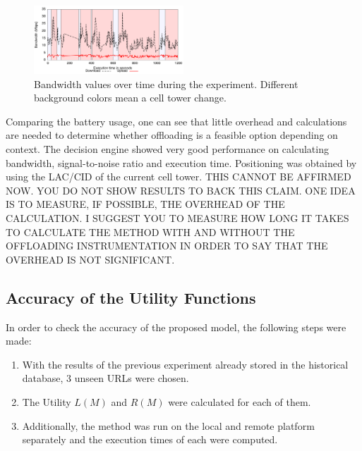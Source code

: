 \documentclass[10pt, conference, letterpaper]{IEEEtran}
\begin{document}
\begin{figure}[b]
  \centering
  \includegraphics[width=0.5\textwidth]{results/plots/bw-fluctuation/executions.png}
  \caption{Bandwidth values over time during the experiment. Different background colors mean a cell tower change.}
  \label{fig:bwtower}
\end{figure}

  
{\color{red}  Comparing the battery usage, one can see that little overhead and calculations are needed to determine whether offloading is a feasible option depending on context. The decision engine showed very good performance on calculating bandwidth, signal-to-noise ratio and execution time. Positioning was obtained by using the LAC/CID of the current cell tower. THIS CANNOT BE AFFIRMED NOW. YOU DO NOT SHOW RESULTS TO BACK THIS CLAIM. ONE IDEA IS TO MEASURE, IF POSSIBLE, THE OVERHEAD OF THE CALCULATION. I SUGGEST YOU TO MEASURE HOW LONG IT TAKES TO CALCULATE THE METHOD WITH AND WITHOUT THE OFFLOADING INSTRUMENTATION IN ORDER TO SAY THAT THE OVERHEAD IS NOT SIGNIFICANT.}



  \subsection{Accuracy of the Utility Functions}

  In order to check the accuracy of the proposed model, the following steps were made:
  \begin{enumerate}
    \item With the results of the previous experiment already stored in the historical database, 3 unseen URLs were chosen.
    \item The Utility $L(M)$ and $R(M)$ were calculated for each of them.
    \item Additionally, the method was run on the local and remote platform separately and the execution times of each were computed.
  \end{enumerate}
\end{document}
